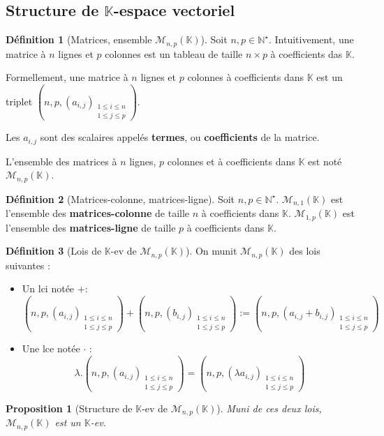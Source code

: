 \documentclass[french]{book}
\newcommand{\N}{\mathbb{N}}
\newcommand{\K}{\mathbb{K}}
\newcommand{\st}{^\star}
\theoremstyle{plain}
\newtheorem{prop}{Proposition}[chapter]
\theoremstyle{definition}
\newtheorem{dfn}{Définition}[chapter]
\theoremstyle{remark}
\begin{document}
\subsection{Structure de $\K$-espace vectoriel}
\begin{dfn}[Matrices, ensemble $\mathcal{M}_{n,p}(\K)$]
	Soit $n,p\in\N\st$. Intuitivement, une matrice à $n$ lignes et $p$ colonnes est un tableau de taille $n\times p$ à coefficients das $\K$. \par Formellement, une matrice à $n$ lignes et $p$ colonnes à coefficients dans $\K$ est un triplet $\displaystyle\left(n,p,(a_{i,j})_{\substack{1\leqslant i\leqslant n \\ 1\leqslant j\leqslant p}}\right)$. \par Les $a_{i,j}$ sont des scalaires appelés \textbf{termes}, ou \textbf{coefficients} de la matrice. \par L'ensemble des matrices à $n$ lignes, $p$ colonnes et à coefficients dans $\K$ est noté $\mathcal{M}_{n,p}(\K)$.
\end{dfn}
\begin{dfn}[Matrices-colonne, matrices-ligne]
	Soit $n,p\in\N\st$. $\mathcal{M}_{n,1}(\K)$ est l'ensemble des \textbf{matrices-colonne} de taille $n$ à coefficients dans $\K$. $\mathcal{M}_{1,p}(\K)$ est l'ensemble des \textbf{matrices-ligne} de taille $p$ à coefficients dans $\K$.
\end{dfn}
\begin{dfn}[Lois de $\K$-ev de $\mathcal{M}_{n,p}(\K)$]
	On munit $\mathcal{M}_{n,p}(\K)$ des lois suivantes : 
	\begin{itemize}
		\item Un lci notée $+$: $$\left(n,p,(a_{i,j})_{\substack{1\leqslant i\leqslant n \\ 1\leqslant j\leqslant p}}\right)+\left(n,p,(b_{i,j})_{\substack{1\leqslant i\leqslant n \\ 1\leqslant j\leqslant p}}\right):=\left(n,p,(a_{i,j}+b_{i,j})_{\substack{1\leqslant i\leqslant n \\ 1\leqslant j\leqslant p}}\right)$$
		\item Une lce notée $\cdot$ : $$\lambda.\left(n,p,(a_{i,j})_{\substack{1\leqslant i\leqslant n \\ 1\leqslant j\leqslant p}}\right)=\left(n,p,(\lambda a_{i,j})_{\substack{1\leqslant i\leqslant n \\ 1\leqslant j\leqslant p}}\right)$$
	\end{itemize}
\end{dfn}
\begin{prop}[Structure de $\K$-ev de $\mathcal{M}_{n,p}(\K)$]
	Muni de ces deux lois, $\mathcal{M}_{n,p}(\K)$ est un $\K$-ev.
\end{prop}
\end{document}
